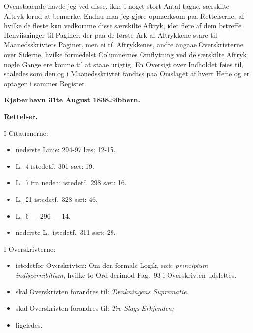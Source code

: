 \documentclass[12pt,a4paper]{book}
\begin{document}
Ovenstaaende havde jeg ved disse, ikke i noget stort Antal tagne,
særskilte Aftryk forud at bemærke. Endnu maa jeg gjøre opmærksom paa
Rettelserne, af hvilke de fleste kun vedkomme disse særskilte Aftryk,
idet flere af dem betreffe Henviisninger til Paginer, der paa de første
Ark af Aftrykkene svare til Maanedsskrivtets Paginer, men ei til
Aftrykkenes, andre angaae Overskrivterne over Siderne, hvilke formedelst
Columnernes Omflytning ved de særskilte Aftryk nogle Gange ere komne til
at staae urigtig. En Oversigt over Indholdet føies til, saaledes som den
og i Maanedsskrivtet fandtes paa Omslaget af hvert Hefte og er optagen i
sammes Register.

\medskip
\noindent \textbf{Kjøbenhavn 31te August 1838.}\hfill \textbf{Sibbern.}

\bigskip
\begin{center}
  \textbf{\large Rettelser.}
\end{center}

\noindent I Citationerne:
\begin{itemize}[leftmargin=3.2em,itemsep=0pt]
  \item[Pag.\ 20] nederste Linie: 294-97 læs: 12-15.
  \item[--- 41] L.\ 4 istedetf.\ 301 sæt: 19.
  \item[--- 43] L.\ 7 fra neden: istedetf.\ 298 sæt: 16.
  \item[--- 62] L.\ 21 istedetf.\ 328 sæt: 46.
  \item[--- 95] L.\ 6 --- 296 --- 14.
  \item[--- 111] nederste L.\ istedetf.\ 311 sæt: 29.
\end{itemize}

\noindent I Overskrivterne:
\begin{itemize}[leftmargin=3.2em,itemsep=0pt]
  \item[--- 91] istedetfor Overskrivten: Om den formale Logik, sæt:
    \textit{principium indiscernibilium}, hvilke to Ord derimod Pag.\ 93
    i Overskrivten udslettes.
  \item[--- 95] skal Overskrivten forandres til: \emph{Tænkningens Suprematie.}
  \item[--- 99] skal Overskrivten forandres til: \emph{Tre Slags Erkjenden;}
  \item[--- 111] ligeledes.
\end{itemize}
\end{document}
